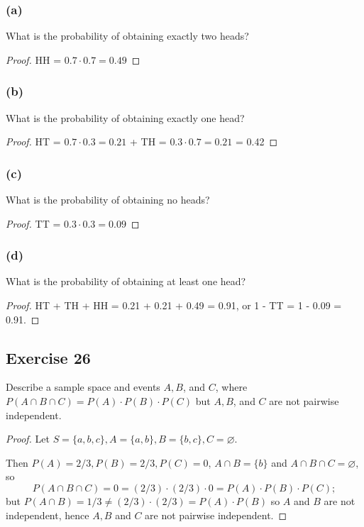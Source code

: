 \documentclass[14pt]{extarticle}
\newcommand{\es}{\varnothing}
\begin{document}
\subsubsection{(a)}
What is the probability of obtaining exactly two heads?
\begin{proof}
HH = \(0.7 \cdot 0.7 = 0.49\)
\end{proof}

\subsubsection{(b)}
What is the probability of obtaining exactly one head?
\begin{proof}
HT = \(0.7 \cdot 0.3 = 0.21\) + TH = \(0.3 \cdot 0.7 = 0.21\) = 0.42  
\end{proof}

\subsubsection{(c)}
What is the probability of obtaining no heads?
\begin{proof}
TT = \(0.3 \cdot 0.3 = 0.09\)
\end{proof}

\subsubsection{(d)}
What is the probability of obtaining at least one head?

\begin{proof}
HT + TH + HH = 0.21 + 0.21 + 0.49 = 0.91, or 1 - TT = 1 - 0.09 = 0.91.
\end{proof}

\subsection{Exercise 26}
Describe a sample space and events \(A, B\), and \(C\), where \(P(A \cap B \cap C) = P(A) \cdot P(B) \cdot P(C)\) but 
\(A, B\), and \(C\) are not pairwise independent.

\begin{proof}
Let \(S = \{a, b, c\}, A = \{a,b\}, B = \{b,c\}, C = \es\). 

Then \(P(A) = 2/3, P(B) = 2/3, P(C) = 0\), \(A \cap B = \{b\}\) and \(A \cap B \cap C = \es\), so 
\[
P(A \cap B \cap C) = 0 = (2/3) \cdot (2/3) \cdot 0 = P(A) \cdot P(B) \cdot P(C);
\] 
but \(P(A \cap B) = 1/3 \neq (2/3) \cdot (2/3) = P(A) \cdot P(B)\) so \(A\) and \(B\) are not independent, hence \(A,B\)
and \(C\) are not pairwise independent.
\end{proof}
\end{document}
